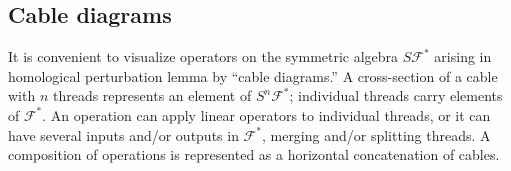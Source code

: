 \documentclass{amsart}
\theoremstyle{plain} %
\theoremstyle{definition}
\theoremstyle{remark}
\newtheorem{rem}[thm]{Remark}
\newcommand{\F}{\mathcal{F}}
\newcommand{\RR}{\mathbb{R}}
\newcommand{\iii}{\mathrm{i}}
\begin{document}

\subsection{Cable diagrams}
It is convenient to visualize operators on the symmetric algebra $S\F^*$ arising in homological perturbation lemma by ``cable diagrams.'' A cross-section of a cable with $n$ threads represents an element of $S^n\F^*$; individual threads carry elements of $\F^*$. 
An operation can apply linear operators to individual threads, or it can have several inputs and/or outputs in $\F^*$, merging and/or splitting threads. 
A composition of operations is represented as a horizontal concatenation of cables. 
\end{document}

